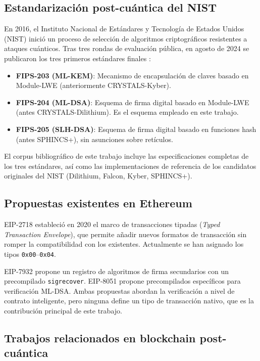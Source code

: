 \subsection*{Estandarización post-cuántica del NIST}

En 2016, el Instituto Nacional de Estándares y Tecnología de Estados Unidos (NIST) inició un proceso de selección de algoritmos criptográficos resistentes a ataques cuánticos. Tras tres rondas de evaluación pública, en agosto de 2024 se publicaron los tres primeros estándares finales \parencite{nistfips203, nistfips204, nistfips205}:

\begin{itemize}
  \item \textbf{FIPS-203 (ML-KEM)}: Mecanismo de encapsulación de claves basado en Module-LWE (anteriormente CRYSTALS-Kyber).
  \item \textbf{FIPS-204 (ML-DSA)}: Esquema de firma digital basado en Module-LWE (antes CRYSTALS-Dilithium). Es el esquema empleado en este trabajo.
  \item \textbf{FIPS-205 (SLH-DSA)}: Esquema de firma digital basado en funciones hash (antes SPHINCS+), sin asunciones sobre retículos.
\end{itemize}

El corpus bibliográfico de este trabajo incluye las especificaciones completas de los tres estándares, así como las implementaciones de referencia de los candidatos originales del NIST (Dilithium, Falcon, Kyber, SPHINCS+).

\subsection*{Propuestas existentes en Ethereum}

EIP-2718 \parencite{eip2718} estableció en 2020 el marco de transacciones tipadas (\emph{Typed Transaction Envelope}), que permite añadir nuevos formatos de transacción sin romper la compatibilidad con los existentes. Actualmente se han asignado los tipos \texttt{0x00}--\texttt{0x04}.

EIP-7932 propone un registro de algoritmos de firma secundarios con un precompilado \texttt{sigrecover}. EIP-8051 propone precompilados específicos para verificación ML-DSA. Ambas propuestas abordan la verificación a nivel de contrato inteligente, pero ninguna define un tipo de transacción nativo, que es la contribución principal de este trabajo.

\subsection*{Trabajos relacionados en blockchain post-cuántica}

